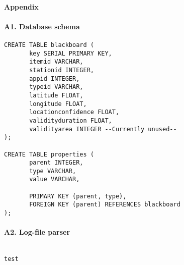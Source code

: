 \paragraph{Appendix}

\paragraph{A1. Database schema}
\begin{verbatim}
CREATE TABLE blackboard (
       key SERIAL PRIMARY KEY,
       itemid VARCHAR,
       stationid INTEGER,
       appid INTEGER,
       typeid VARCHAR,
       latitude FLOAT,
       longitude FLOAT,
       locationconfidence FLOAT,
       validityduration FLOAT,
       validityarea INTEGER --Currently unused--                                              
);

CREATE TABLE properties (
       parent INTEGER,
       type VARCHAR,
       value VARCHAR,

       PRIMARY KEY (parent, type),
       FOREIGN KEY (parent) REFERENCES blackboard
);
\end{verbatim}

\newpage
\paragraph{A2. Log-file parser}
\begin{verbatim}

test

\end{verbatim}
